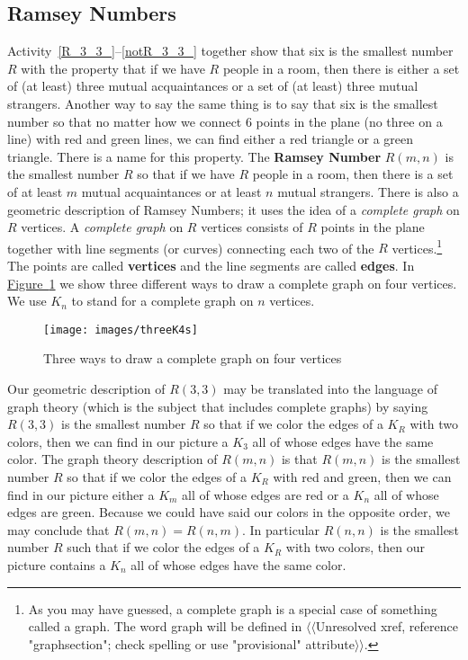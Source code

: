 \documentclass[10pt,]{book}
\newcommand{\terminology}[1]{\textbf{#1}}
\theoremstyle{plain}
\theoremstyle{definition}
\numberwithin{equation}{chapter}
\begin{document}
\subsection[{Ramsey Numbers}]{Ramsey Numbers}\label{Ramseysection}
Activity~\hyperref[R_3_3_]{\ref{R_3_3_}}--\hyperref[notR_3_3_]{\ref{notR_3_3_}} together show that six is the smallest number \(R\) with the property that if we have \(R\) people in a room, then there is either a set of (at least) three mutual acquaintances or a set of (at least) three mutual strangers. Another way to say the same thing is to say that six is the smallest number so that no matter how we connect 6 points in the plane (no three on a line) with red and green lines, we can find either a red triangle or a green triangle. There is a name for this property. The \terminology{Ramsey Number} \(R(m,n)\) is the smallest number \(R\) so that if we have \(R\) people in a room, then there is a set of at least \(m\) mutual acquaintances or at least \(n\) mutual strangers. There is also a geometric description of Ramsey Numbers; it uses the idea of a \emph{complete graph} on \(R\) vertices. A \emph{complete graph} on \(R\) vertices consists of \(R\) points in the plane together with line segments (or curves) connecting each two of the \(R\) vertices.\footnote{As you may have guessed, a complete graph is a special case of something called a graph.  The word graph will be defined in {$\langle\langle$Unresolved xref, reference "graphsection"; check spelling or use "provisional" attribute$\rangle\rangle$}.\label{fn-2}} The points are called \terminology{vertices} and the line segments are called \terminology{edges}. In \hyperref[completegraph]{Figure~\ref{completegraph}} we show three different ways to draw a complete graph on four vertices. We use \(K_n\) to stand for a complete graph on \(n\) vertices.%
\begin{figure}
\centering
\texttt{[image: images/threeK4s]}
\caption{Three ways to draw a complete graph on four vertices\label{completegraph}}
\end{figure}
Our geometric description of \(R(3,3)\) may be translated into the language of graph theory (which is the subject that includes complete graphs) by saying \(R(3,3)\) is the smallest number \(R\) so that if we color the edges of a \(K_R\) with two colors, then we can find in our picture a \(K_3\) all of whose edges have the same color.  The graph theory description of \(R(m,n)\) is that \(R(m,n)\) is the smallest number \(R\) so that if we color the edges of a \(K_R\) with red and green, then we can find in our picture either a \(K_m\) all of whose edges are red or a \(K_n\) all of whose edges are green. Because we could have said our colors in the opposite order, we may conclude that \(R(m,n) = R(n,m)\). In particular \(R(n,n)\) is the smallest number \(R\) such that if we color the edges of a \(K_R\) with two colors, then our picture contains a \(K_n\) all of whose edges have the same color.%
\end{document}
